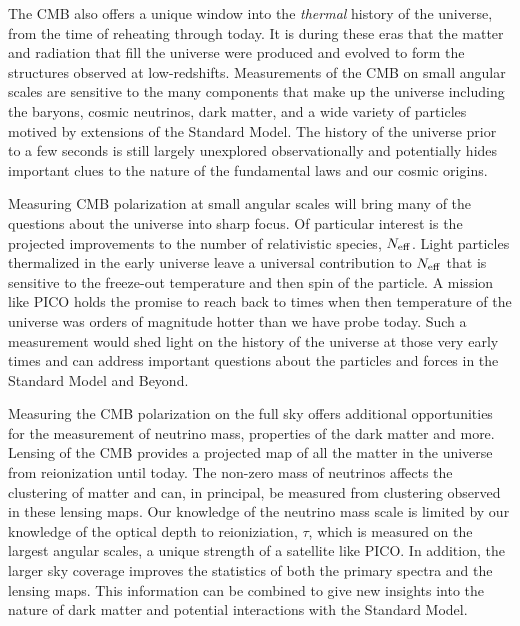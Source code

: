 \documentclass[PICOReport.tex]{subfiles}
\begin{document}
\vskip 10pt
The CMB also offers a unique window into the {\it thermal} history of the universe, from the time of reheating through today.  It is during these eras that the matter and radiation that fill the universe were produced and evolved to form the structures observed at low-redshifts.  Measurements of the CMB on small angular scales are sensitive to the many components that make up the universe including the baryons, cosmic neutrinos, dark matter, and a wide variety of particles motived by extensions of the Standard Model.  The history of the universe prior to a few seconds is still largely unexplored observationally and potentially hides important clues to the nature of the fundamental laws and our cosmic origins.

Measuring CMB polarization at small angular scales will bring many of the questions about the universe into sharp focus.  Of particular interest is the projected improvements to the number of relativistic species, ${N_{\rm eff}}$.  Light particles thermalized in the early universe leave a universal contribution to ${N_{\rm eff}}$ that is sensitive to the freeze-out temperature and then spin of the particle.  A mission like PICO holds the promise to reach back to times when then temperature of the universe was orders of magnitude hotter than we have probe today.  Such a measurement would shed light on the history of the universe at those very early times and can address important questions about the particles and forces in the Standard Model and Beyond.

Measuring the CMB polarization on the full sky offers additional opportunities for the measurement of neutrino mass, properties of the dark matter and more.  Lensing of the CMB provides a projected map of all the matter in the universe from reionization until today.  The non-zero mass of neutrinos affects the clustering of matter and can, in principal, be measured from clustering observed in these lensing maps.  Our knowledge of the neutrino mass scale is limited by our knowledge of the optical depth to reioniziation, $\tau$, which is measured on the largest angular scales, a unique strength of a satellite like PICO.  In addition, the larger sky coverage improves the statistics of both the primary spectra and the lensing maps.  This information can be combined to give new insights into the nature of dark matter and potential interactions with the Standard Model.
\end{document}
